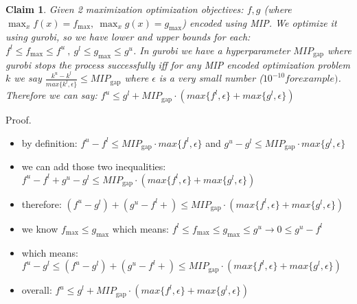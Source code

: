 \documentclass[11pt]{article}
\newtheorem{claim}{Claim}
\begin{document}
 
  \begin{claim}\label{claim:BoundriesForVhagar}
Given 2 maximization optimization objectives: $f,g$ (where $\max_x {f(x)}=f_\text{max},\ \max_x {g(x)}=g_\text{max}$) encoded using MIP. We optimize it using gurobi, so we have lower and upper bounds for each: $f^l \leq f_\text{max} \leq f^u\ ,\ g^l \leq g_\text{max} \leq g^u$. In gurobi we have a hyperparameter $MIP_\text{gap}$ where gurobi stops the process successfully iff for any MIP encoded optimization problem $k$ we say $\frac{k^u-k^l}{max\{k^l,\epsilon\}}\leq MIP_\text{gap}$ where $\epsilon$ is a very small number ($10^{-10} for example)$. Therefore we can say: $f^u\leq g^l+ MIP_\text{gap}\cdot (max\{f^l,\epsilon\}+max\{g^l,\epsilon\})$
 \end{claim}
 Proof. \begin{itemize}
   \item  by definition: $f^u-f^l \leq MIP_\text{gap}\cdot {max\{f^l,\epsilon\}}$ and $g^u-g^l \leq MIP_\text{gap}\cdot {max\{g^l,\epsilon\}}$
   \item we can add those two inequalities: $f^u-f^l+g^u-g^l \leq  MIP_\text{gap}\cdot (max\{f^l,\epsilon\}+max\{g^l,\epsilon\})$
   \item therefore: $(f^u-g^l)+(g^u-f^l+) \leq  MIP_\text{gap}\cdot (max\{f^l,\epsilon\}+max\{g^l,\epsilon\})$
   \item we know $f_\text{max} \leq g_\text{max}$ which means: $f^l \leq f_\text{max} \leq g_\text{max} \leq g^u \rightarrow 0 \leq g^u- f^l$
   \item which means: $f^u-g^l \leq (f^u-g^l)+(g^u-f^l+) \leq  MIP_\text{gap}\cdot (max\{f^l,\epsilon\}+max\{g^l,\epsilon\})$
   \item overall: $f^u\leq g^l+ MIP_\text{gap}\cdot (max\{f^l,\epsilon\}+max\{g^l,\epsilon\})$

 \end{itemize}
 
 
\end{document}
